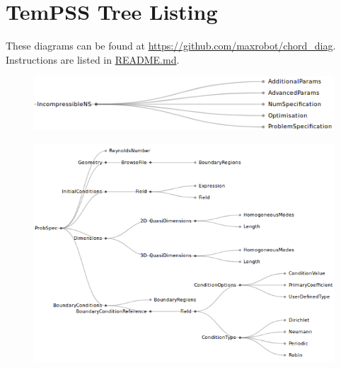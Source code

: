 \documentclass[11pt, a4paper]{report}
\begin{document}
\newpage
%

\newpage
\appendix
\chapter{TemPSS Tree Listing}
\label{app:tempss_function}
\vspace*{-1cm}
These diagrams can be found at \url{https://github.com/maxrobot/chord_diag}. Instructions are listed in \url{README.md}.

\begin{figure}[htb!]
 \centering
 \includegraphics[width=.8\linewidth,  clip=true, trim = .1cm 0cm 0cm 0cm]{overview}
 \label{fig:overview}
\end{figure}

\begin{figure}[htb!]
 \centering
 \includegraphics[width=1\linewidth,  clip=true, trim = 0cm 0cm 0cm 0cm]{problemSpecification}
 \label{fig:problemSpecification}
\end{figure}
\end{document}
